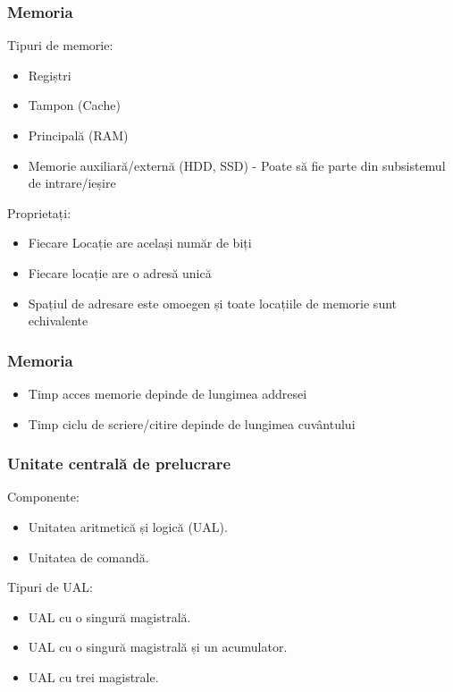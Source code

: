 \begin{frame}
    \frametitle{Memoria}
    Tipuri de memorie:
    \begin{itemize}
        \item Regiștri
        \item Tampon (Cache)
        \item Principală (RAM)
        \item Memorie auxiliară/externă (HDD, SSD) - Poate să fie parte din subsistemul de intrare/ieșire
    \end{itemize}
    Proprietați:
    \begin{itemize}
        \item Fiecare Locație are același număr de biți
        \item Fiecare locație are o adresă unică 
        \item Spațiul de adresare este omoegen și toate locațiile de memorie sunt echivalente
    \end{itemize}
\end{frame}

\begin{frame}
    \frametitle{Memoria}
    \newsavebox{\asciimemwrite}
    \begin{lrbox}{\asciimemwrite}
        \begin{varwidth}{\maxdimen}
        \end{varwidth}
    \end{lrbox}%

    \begin{figure}[h]
        \centering
        \scalebox{0.8}{\usebox{\asciimemwrite}}
    \end{figure}
    \begin{itemize}
        \item Timp acces memorie depinde de lungimea addresei
        \item Timp ciclu de scriere/citire depinde de lungimea cuvântului
    \end{itemize}
\end{frame}


\begin{frame}
    \frametitle{Unitate centrală de prelucrare}
    Componente:
    \begin{itemize}
        \item Unitatea aritmetică și logică (UAL).
        \item Unitatea de comandă.
    \end{itemize}
    Tipuri de UAL:
    \begin{itemize}
        \item UAL cu o singură magistrală.
        \item UAL cu o singură magistrală și un acumulator.
        \item UAL cu trei magistrale.
    \end{itemize}
\end{frame}

